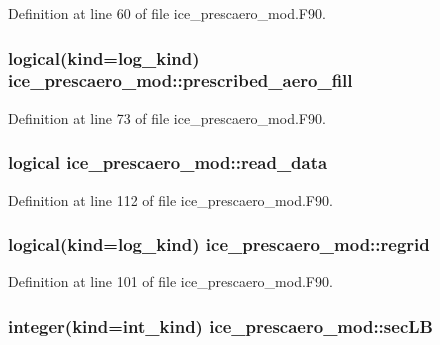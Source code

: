 Definition at line 60 of file ice\_\-prescaero\_\-mod.F90.\hypertarget{namespaceice__prescaero__mod_aa57981b6da9b30b28d73604e3a8b9851}{
\subsubsection[{prescribed\_\-aero\_\-fill}]{\setlength{\rightskip}{0pt plus 5cm}logical(kind=log\_\-kind) {\bf ice\_\-prescaero\_\-mod::prescribed\_\-aero\_\-fill}}}
\label{namespaceice__prescaero__mod_aa57981b6da9b30b28d73604e3a8b9851}


Definition at line 73 of file ice\_\-prescaero\_\-mod.F90.\hypertarget{namespaceice__prescaero__mod_af2c2ae945aa6208a444abc903ead27d9}{
\subsubsection[{read\_\-data}]{\setlength{\rightskip}{0pt plus 5cm}logical {\bf ice\_\-prescaero\_\-mod::read\_\-data}}}
\label{namespaceice__prescaero__mod_af2c2ae945aa6208a444abc903ead27d9}


Definition at line 112 of file ice\_\-prescaero\_\-mod.F90.\hypertarget{namespaceice__prescaero__mod_af47c8a64b468928d1aaad008ef8609d8}{
\subsubsection[{regrid}]{\setlength{\rightskip}{0pt plus 5cm}logical(kind=log\_\-kind) {\bf ice\_\-prescaero\_\-mod::regrid}}}
\label{namespaceice__prescaero__mod_af47c8a64b468928d1aaad008ef8609d8}


Definition at line 101 of file ice\_\-prescaero\_\-mod.F90.\hypertarget{namespaceice__prescaero__mod_a93fbf6de60396f73513b16a2d0230a0b}{
\subsubsection[{secLB}]{\setlength{\rightskip}{0pt plus 5cm}integer(kind=int\_\-kind) {\bf ice\_\-prescaero\_\-mod::secLB}}}
\label{namespaceice__prescaero__mod_a93fbf6de60396f73513b16a2d0230a0b}


